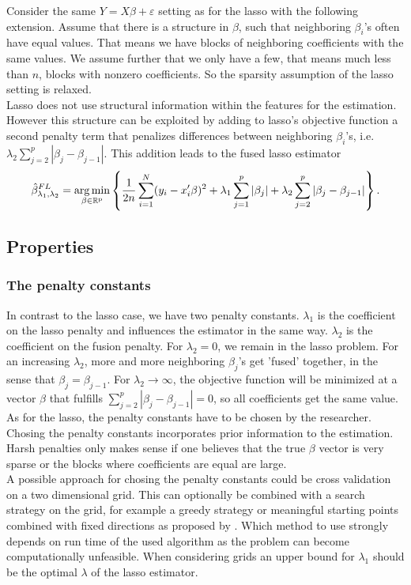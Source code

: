 \documentclass{article}
\theoremstyle{definition}
\DeclareMathOperator*{\argmin}{arg\,min}
\begin{document}
Consider the same $Y=X\beta+\varepsilon$ setting as for the lasso with the following extension. Assume that there is a structure in $\beta$, such that neighboring $\beta_i$'s often have equal values. That means we have blocks of neighboring coefficients with the same values. We assume further that we only have a few, that means much less than $n$, blocks with nonzero coefficients. So the sparsity assumption of the lasso setting is relaxed.\\
Lasso does not use structural information within the features for the estimation. However this structure can be exploited by adding to lasso's objective function a second penalty term that penalizes differences between neighboring $\beta_i$'s, i.e. $\lambda_2\sum_{j=2}^p|\beta_j- \beta_{j-1}|$. This addition leads to the fused lasso estimator 
	\begin{equation}
		\hat{\beta}_{\lambda_1,\lambda_2}^{FL}=\argmin_{\beta \in\rm \mathbb{R}^p} \left\{ \frac{1}{2n}  \sum_{i=1}^{N}(y_{i}-x_{i}'\beta)^2+\lambda_1 \sum_{j=1}^p|\beta_j|+ \lambda_2 \sum_{j=2}^p|\beta_j- \beta_{j-1}| \right \}.
	\end{equation}
	
	
\subsection{Properties}

\subsubsection{The penalty constants} \label{subsec: penalties}
In contrast to the lasso case, we have two penalty constants. $\lambda_1$ is the coefficient on the lasso penalty and influences the estimator in the same way. $\lambda_2$ is the coefficient on the fusion penalty.  For $\lambda_2=0$, we remain in the lasso problem. For an increasing $\lambda_2$, more and more neighboring $\beta_j$'s get 'fused' together, in the sense that $\beta_j=\beta_{j-1}$. For $\lambda_2\to\infty$, the objective function will be minimized at a vector $\beta$ that fulfills $\sum_{j=2}^p|\beta_j- \beta_{j-1}|=0$, so all coefficients get the same value.\\
As for the lasso, the penalty constants have to be chosen by the researcher.
Chosing the penalty constants incorporates prior information to the estimation. Harsh penalties only makes sense if one believes that the true $\beta$ vector is very sparse or the blocks where coefficients are equal are large. \\
A possible approach for chosing the penalty constants could be cross validation on a two dimensional grid. This can optionally be combined with a search strategy on the grid, for example a greedy strategy or meaningful starting points combined with fixed directions as proposed by \citep{fused}. Which method to use strongly depends on run time of the used algorithm as the problem can become computationally unfeasible. 
When considering grids an upper bound for $\lambda_1$ should be the optimal $\lambda$ of the lasso estimator.
\end{document}
